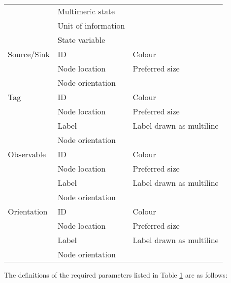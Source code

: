 \documentclass[11pt]{article}
\begin{document}
\begin{table}[H]
\begin{tabular*}{0.95\textwidth}{ l l l   }
      					& Multimeric state	&  \\
       					& Unit of information	&  \\
     					& State variable	&  \\
     \midrule
      Source/Sink			& ID				& Colour \\
					& Node location	& Preferred size \\
      					& Node orientation	&  \\
     \midrule
      Tag				& ID				& Colour \\
					& Node location	& Preferred size \\
      				      	& Label 			& Label drawn as multiline\\
      					& Node orientation	&  \\
     \midrule
      Observable			& ID				& Colour \\
					& Node location	& Preferred size \\
      				      	& Label 			& Label drawn as multiline\\
      					& Node orientation	&  \\
     \midrule
      Orientation			& ID				& Colour \\
					& Node location	& Preferred size \\
      				      	& Label 			& Label drawn as multiline\\
      					& Node orientation	&  \\
     \bottomrule
   \end{tabular*}
   \label{tab:epn_specs}
\end{table}

The definitions of the required parameters listed in Table \ref{tab:epn_specs} are as follows:
\end{document}
